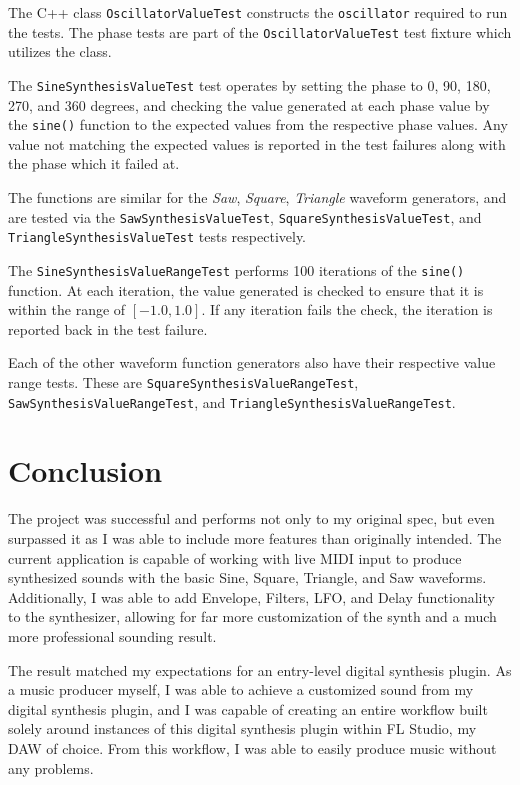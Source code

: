 \documentclass[a4paper,12pt]{report}
\begin{document}
The C++ class \texttt{Oscillator\-Value\-Test} constructs the \texttt{oscillator} required to run the tests. The phase tests are part of the \texttt{Oscillator\-Value\-Test} test fixture which utilizes the class.

The \texttt{Sine\-Synthesis\-Value\-Test} test operates by setting the phase to 0, 90, 180, 270, and 360 degrees, and checking the value generated at each phase value by the \texttt{sine()} function to the expected values from the respective phase values. Any value not matching the expected values is reported in the test failures along with the phase which it failed at.

The functions are similar for the \emph{Saw}, \emph{Square}, \emph{Triangle} waveform generators, and are tested via the \texttt{Saw\-Synthesis\-Value\-Test}, \texttt{Square\-Synthesis\-Value\-Test}, and \texttt{Triangle\-Synthesis\-Value\-Test} tests respectively.

The \texttt{Sine\-Synthesis\-Value\-Range\-Test} performs 100 iterations of the \texttt{sine()} function. At each iteration, the value generated is checked to ensure that it is within the range of $[-1.0,1.0]$. If any iteration fails the check, the iteration is reported back in the test failure.

Each of the other waveform function generators also have their respective value range tests. These are \texttt{Square\-Synthesis\-Value\-Range\-Test}, \texttt{Saw\-Synthesis\-Value\-Range\-Test}, and \texttt{Triangle\-Synthesis\-Value\-Range\-Test}.

\chapter{Conclusion}
\label{chapter:results}
The project was successful and performs not only to my original spec, but even surpassed it as I was able to include more features than originally intended. The current application is capable of working with live MIDI input to produce synthesized sounds with the basic Sine, Square, Triangle, and Saw waveforms. Additionally, I was able to add Envelope, Filters, LFO, and Delay functionality to the synthesizer, allowing for far more customization of the synth and a much more professional sounding result. 

The result matched my expectations for an entry-level digital synthesis plugin. As a music producer myself, I was able to achieve a customized sound from my digital synthesis plugin, and I was capable of creating an entire workflow built solely around instances of this digital synthesis plugin within FL Studio, my DAW of choice. From this workflow, I was able to easily produce music without any problems.
\end{document}
